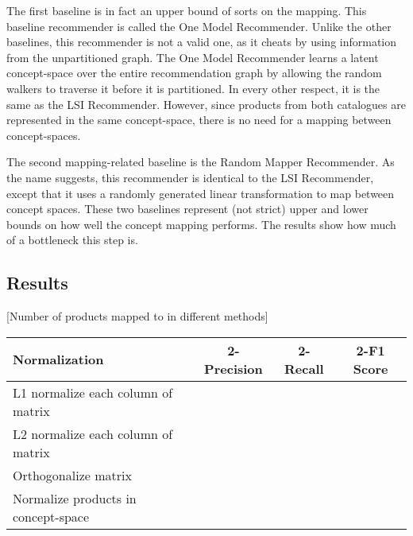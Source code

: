 \documentclass[11pt]{article}
\begin{document}
The first baseline is in fact an upper bound of sorts on the mapping. This
baseline recommender is called the One Model Recommender. Unlike the other
baselines, this recommender is not a valid one, as it cheats by using
information from the unpartitioned graph. The One Model Recommender learns a
latent concept-space over the entire recommendation graph by allowing the random
walkers to traverse it before it is partitioned. In every other respect, it is
the same as the LSI Recommender. However, since products from both catalogues
are represented in the same concept-space, there is no need for a mapping
between concept-spaces.

The second mapping-related baseline is the Random Mapper Recommender. As the
name suggests, this recommender is identical to the LSI Recommender, except that
it uses a randomly generated linear transformation to map between concept
spaces. These two baselines represent (not strict) upper and lower bounds on how
well the concept mapping performs. The results show how much of a bottleneck
this step is.

\subsection*{Results}
[Number of products mapped to in different methods]
\begin{center}
\begin{tabular}{ | l | c | c | c |}
\hline
Normalization & 2-Precision & 2-Recall & 2-F1 Score \\ \hline\hline
L1 normalize each column of matrix &&&\\ \hline
L2 normalize each column of matrix &&&\\ \hline
Orthogonalize matrix &&&\\ \hline
Normalize products in concept-space &&&\\ \hline
\end{tabular}
\end{center}
\end{document}
